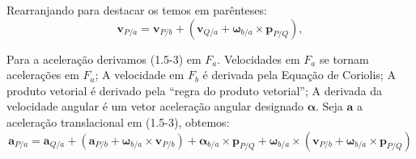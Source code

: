 Rearranjando para destacar os temos em parênteses\footnotemark{}:
\begin{equation*}
    \mathbf{v}_{P/a} = \mathbf{v}_{P/b} + \left( \mathbf{v}_{Q/a} + \mathbf{\omega}_{b/a}\!\times\!\mathbf{p}_{P/Q} \right),
\end{equation*}

Para a aceleração derivamos (1.5-3) em \(F_{a}\). Velocidades em \(F_{a}\) se tornam acelerações em \(F_{a}\); A velocidade em \(F_{b}\) é derivada pela Equação de Coriolis; A produto vetorial é derivado pela ``regra do produto vetorial''\footnotemark{}; A derivada da velocidade angular é um vetor aceleração angular designado \(\mathbf{\alpha}\). Seja \(\mathbf{a}\) a aceleração translacional em (1.5-3), obtemos:
\begin{equation*}
    \mathbf{a}_{P/a} = \mathbf{a}_{Q/a} + \left(\mathbf{a}_{P/b} + \mathbf{\omega}_{b/a}\!\times\!\mathbf{v}_{P/b}\right) + {{\mathbf{\alpha}_{b/a}}\!\times\!{\mathbf{p}_{P/Q}}} + {\mathbf{\omega}_{b/a}}\!\times\!{\left({\mathbf{v}_{P/b}} + {{\mathbf{\omega}_{b/a}}\!\times\!{\mathbf{p}_{P/Q}}}\right)}
\end{equation*}

